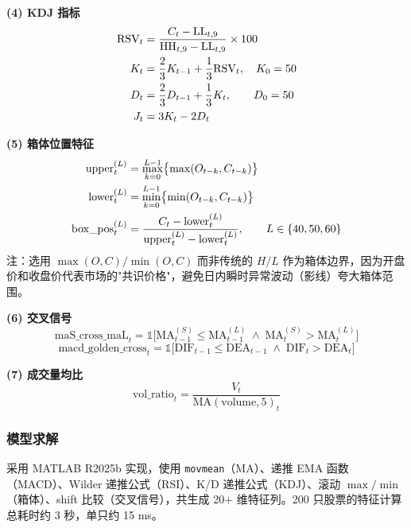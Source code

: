 \documentclass[12pt,a4paper]{ctexart}
\numberwithin{figure}{section}
\numberwithin{table}{section}
\begin{document}
\noindent\textbf{(4) KDJ 指标}
\begin{align}
    \text{RSV}_t &= \frac{C_t - \text{LL}_{t,9}}{\text{HH}_{t,9} - \text{LL}_{t,9}} \times 100 \notag\\
    K_t &= \frac{2}{3}K_{t-1} + \frac{1}{3}\text{RSV}_t, \quad K_0 = 50 \notag\\
    D_t &= \frac{2}{3}D_{t-1} + \frac{1}{3}K_t, \qquad D_0 = 50 \notag\\
    J_t &= 3K_t - 2D_t
\end{align}

\noindent\textbf{(5) 箱体位置特征}
\begin{align}
    \text{upper}_t^{(L)} &= \max_{k=0}^{L-1}\bigl\{\max(O_{t-k}, C_{t-k})\bigr\} \notag\\
    \text{lower}_t^{(L)} &= \min_{k=0}^{L-1}\bigl\{\min(O_{t-k}, C_{t-k})\bigr\} \notag\\
    \text{box\_pos}_t^{(L)} &= \frac{C_t - \text{lower}_t^{(L)}}{\text{upper}_t^{(L)} - \text{lower}_t^{(L)}}, \qquad L \in \{40, 50, 60\}
\end{align}
注：选用 $\max(O,C)/\min(O,C)$ 而非传统的 $H/L$ 作为箱体边界，因为开盘价和收盘价代表市场的"共识价格"，避免日内瞬时异常波动（影线）夸大箱体范围。

\noindent\textbf{(6) 交叉信号}
\begin{equation}
    \text{maS\_cross\_maL}_t = \mathbb{1}\bigl[\text{MA}_{t-1}^{(S)} \le \text{MA}_{t-1}^{(L)} \;\land\; \text{MA}_t^{(S)} > \text{MA}_t^{(L)}\bigr]
\end{equation}
\begin{equation}
    \text{macd\_golden\_cross}_t = \mathbb{1}\bigl[\text{DIF}_{t-1} \le \text{DEA}_{t-1} \;\land\; \text{DIF}_t > \text{DEA}_t\bigr]
\end{equation}

\noindent\textbf{(7) 成交量均比}
\begin{equation}
    \text{vol\_ratio}_t = \frac{V_t}{\text{MA}(\text{volume}, 5)_t}
\end{equation}

\subsubsection{模型求解}
采用 MATLAB R2025b 实现，使用 \texttt{movmean}（MA）、递推 EMA 函数（MACD）、Wilder 递推公式（RSI）、K/D 递推公式（KDJ）、滚动 $\max/\min$（箱体）、shift 比较（交叉信号），共生成 20+ 维特征列。200 只股票的特征计算总耗时约 3 秒，单只约 15 ms。
\end{document}
